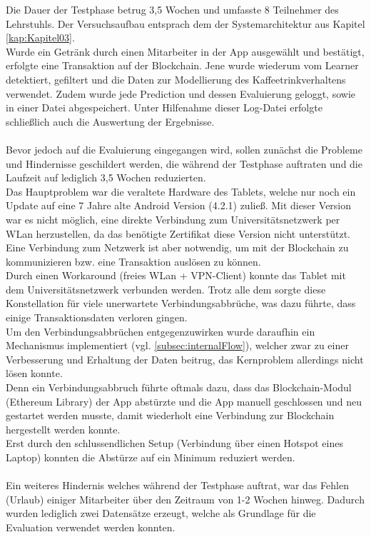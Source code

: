 Die Dauer der Testphase betrug 3,5 Wochen und umfasste 8 Teilnehmer des Lehrstuhls. Der Versuchsaufbau entsprach dem der Systemarchitektur aus Kapitel \ref{kap:Kapitel03}. \\
Wurde ein Getränk durch einen Mitarbeiter in der App ausgewählt und bestätigt, erfolgte eine Transaktion auf der Blockchain. Jene wurde wiederum vom Learner detektiert, gefiltert und die Daten zur Modellierung des Kaffeetrinkverhaltens verwendet. Zudem wurde jede Prediction und dessen Evaluierung geloggt, sowie in einer Datei abgespeichert. Unter Hilfenahme dieser Log-Datei erfolgte schließlich auch die Auswertung der Ergebnisse.\\\\
Bevor jedoch auf die Evaluierung eingegangen wird, sollen zunächst die Probleme und Hindernisse geschildert werden, die während der Testphase auftraten und die Laufzeit auf lediglich 3,5 Wochen reduzierten.\\
Das Hauptproblem war die veraltete Hardware des Tablets, welche nur noch ein Update auf eine 7 Jahre alte Android Version (4.2.1) zuließ. Mit dieser Version war es nicht möglich, eine direkte Verbindung zum Universitätsnetzwerk per WLan herzustellen, da das benötigte Zertifikat diese Version nicht unterstützt. Eine Verbindung zum Netzwerk ist aber notwendig, um mit der Blockchain zu kommunizieren bzw. eine Transaktion auslösen zu können. \\
Durch einen Workaround (freies WLan + VPN-Client) konnte das Tablet mit dem Universitätsnetzwerk verbunden werden. Trotz alle dem sorgte diese Konstellation für viele unerwartete Verbindungsabbrüche, was dazu führte, dass einige Transaktionsdaten verloren gingen. \\
Um den Verbindungsabbrüchen entgegenzuwirken wurde daraufhin ein Mechanismus implementiert (vgl. \ref{subsec:internalFlow}), welcher zwar zu einer Verbesserung und Erhaltung der Daten beitrug, das Kernproblem allerdings nicht lösen konnte. \\ 
Denn ein Verbindungsabbruch führte oftmals dazu, dass das Blockchain-Modul (Ethereum Library) der App abstürzte und die App manuell geschlossen und neu gestartet werden musste, damit wiederholt eine Verbindung zur Blockchain hergestellt werden konnte. \\
Erst durch den schlussendlichen Setup (Verbindung über einen Hotspot eines Laptop) konnten die Abstürze auf ein Minimum reduziert werden.\\\\
Ein weiteres Hindernis welches während der Testphase auftrat, war das Fehlen (Urlaub) einiger Mitarbeiter über den Zeitraum von 1-2 Wochen hinweg. Dadurch wurden lediglich zwei Datensätze erzeugt, welche als Grundlage für die Evaluation verwendet werden konnten. 

